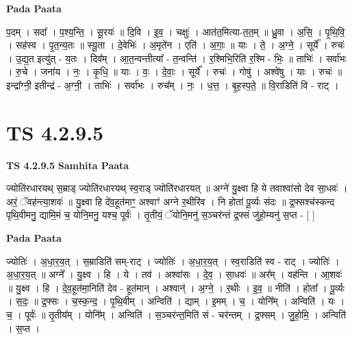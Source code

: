 \documentclass[17pt]{extarticle}
\begin{document}
\textbf{Pada Paata} \newline

प॒दम् । सदा᳚ । प॒श्य॒न्ति॒ । सू॒रयः॑ ॥ दि॒वि । इ॒व॒ । चक्षुः॑ । आत॑त॒मित्या-त॒त॒म् ॥ ध्रु॒वा । अ॒सि॒ । पृ॒थि॒वि॒ । सह॑स्व । पृ॒त॒न्य॒तः ॥ स्यू॒ता । दे॒वेभिः॑ । अ॒मृते॑न । एति॑ । अ॒गाः॒ ॥ याः । ते॒ । अ॒ग्ने॒ । सूर्ये᳚ । रुचः॑ । उ॒द्य॒त इत्यु॑त् - य॒तः । दिव᳚म् । आ॒त॒न्वन्तीत्या᳚ - त॒न्वन्ति॑ । र॒श्मिभि॒रिति॑ र॒श्मि - भिः॒ ॥ ताभिः॑ । सर्वा॑भः । रु॒चे । जना॑य । नः॒ । कृ॒धि॒ ॥ याः । वः॒ । दे॒वाः॒ । सूर्ये᳚ । रुचः॑ । गोषु॑ । अश्वे॑षु । याः । रुचः॑ ॥ इन्द्रा᳚ग्नी॒ इतीन्द्र॑ - अ॒ग्नी॒ । ताभिः॑ । सर्वा॑भः । रुच᳚म् । नः॒ । ध॒त्त॒ । बृ॒ह॒स्प॒ते॒ ॥ वि॒राडिति॑ वि - राट् ।  \newline




\section*{ TS 4.2.9.5 }

\textbf{TS 4.2.9.5 } \newline
\textbf{Samhita Paata} \newline

ज्योति॑रधारयथ् स॒म्राड् ज्योति॑रधारयथ् स्व॒राड् ज्योति॑रधारयत् ॥ अग्ने॑ यु॒क्ष्वा हि ये तवाश्वा॑सो देव सा॒धवः॑ । अरं॒ ॅवह॑न्त्या॒शवः॑ ॥ यु॒क्ष्वा हि दे॑व॒हूत॑माꣳ॒॒ अश्वाꣳ॑ अग्ने र॒थीरि॑व । नि होता॑ पू॒र्व्यः स॑दः ॥ द्र॒फ्सश्च॑स्कन्द पृथि॒वीमनु॒ द्यामि॒मं च॒ योनि॒मनु॒ यश्च॒ पूर्वः॑ । तृ॒तीयं॒ ॅयोनि॒मनु॑ स॒ञ्चर॑न्तं द्र॒फ्सं जु॑हो॒म्यनु॑ स॒प्त - [  ] \newline

\textbf{Pada Paata} \newline

ज्योतिः॑ । अ॒धा॒र॒य॒त् । स॒म्राडिति॑ सम्-राट् । ज्योतिः॑ । अ॒धा॒र॒य॒त् । स्व॒राडिति॑ स्व - राट् । ज्योतिः॑ । अ॒धा॒र॒य॒त् ॥ अग्ने᳚ । यु॒क्ष्व । हि । ये । तव॑ । अश्वा॑सः । दे॒व॒ । सा॒धवः॑ ॥ अर᳚म् । वह॑न्ति । आ॒शवः॑ ॥ यु॒क्ष्व । हि । दे॒व॒हूत॑मा॒निति॑ देव - हूत॑मान् । अश्वान्॑ । अ॒ग्ने॒ । र॒थीः । इ॒व॒ ॥ नीति॑ । होता᳚ । पू॒र्व्यः । स॒दः॒ ॥ द्र॒फ्सः । च॒स्क॒न्द॒ । पृ॒थि॒वीम् । अन्विति॑ । द्याम् । इ॒मम् । च॒ । योनि᳚म् । अन्विति॑ । यः । च॒ । पूर्वः॑ ॥ तृ॒तीय᳚म् । योनि᳚म् । अन्विति॑ । स॒ञ्चर॑न्त॒मिति॑ सं - चर॑न्तम् । द्र॒फ्सम् । जु॒हो॒मि॒ । अन्विति॑ । स॒प्त ।  \newline




\end{document}
